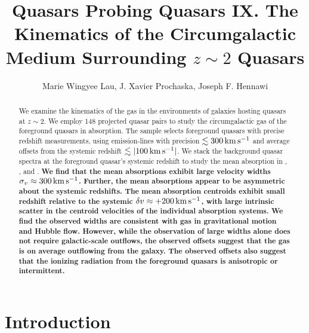 \documentclass[iop]{emulateapj}
\begin{document}
\title{Quasars Probing Quasars IX. The Kinematics of the Circumgalactic Medium Surrounding
$z\sim2$ Quasars}

\author{Marie Wingyee Lau, J. Xavier Prochaska,
Joseph F. Hennawi
}

\begin{abstract}
We examine the kinematics of the gas in the environments of galaxies hosting quasars at $z\sim2$.
We employ 148 projected quasar pairs to study the circumgalactic gas of the foreground quasars in
absorption. The sample selects foreground quasars with precise redshift measurements, using
emission-lines with precision $\lesssim300\,{\rm km\,s^{-1}}$ and average offsets from the
systemic redshift $\lesssim|100\,{\rm km\,s^{-1}}|$. We stack the background quasar spectra at the
foreground quasar's systemic redshift to study the mean absorption in , ,
and .
{\bf We find that the mean absorptions exhibit large velocity widths
$\sigma_v\approx300\,{\rm km\,s^{-1}}$. Further, the mean absorptions appear to be asymmetric about
the systemic redshifts. The mean absorption centroids exhibit small redshift relative to the
systemic $\delta v\approx+200\,{\rm km\,s^{-1}}$, with large intrinsic scatter in the centroid
velocities of the individual absorption systems.
We find the observed widths are consistent with gas in gravitational
motion and Hubble flow. However, while the observation of large widths alone does not require
galactic-scale outflows, the observed offsets suggest that the gas is on average outflowing from the
galaxy. The observed offsets also suggest that the ionizing radiation from the foreground quasars
is anisotropic or intermittent.}
\end{abstract}



\section{Introduction}
\label{sec:introduction}
\end{document}
